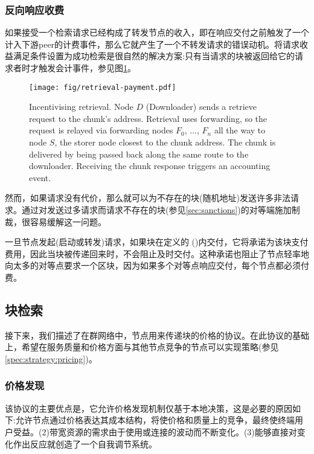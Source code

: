 \subsubsection{反向响应收费}

如果接受一个检索请求已经构成了转发节点的收入，即在响应交付之前触发了一个计入下游peer的计费事件，那么它就产生了一个不转发请求的错误动机。将请求收益满足条件设置为成功检索是很自然的解决方案:只有当请求的块被返回给它的请求者时才触发会计事件，参见图\ref{fig:retrieval-payment}。


\begin{figure}[htbp]
   \centering
   \texttt{[image: fig/retrieval-payment.pdf]}
   \caption[Incentivising retrieval \statusgreen]{Incentivising retrieval. Node $D$ (Downloader) sends a retrieve request to the chunk's address. Retrieval uses forwarding, so the request is relayed via forwarding nodes $F_0$, ..., $F_n$ all the way to node $S$, the storer node closest to the chunk address. The chunk is delivered by being passed back along the same route to the downloader. Receiving the chunk response triggers an accounting event.}
   \label{fig:retrieval-payment}
\end{figure}

然而，如果请求没有代价，那么就可以为不存在的块(随机地址)发送许多非法请求。通过对发送过多请求而请求不存在的块(参见\ref{sec:sanctions})的对等端施加制裁，很容易缓解这一问题。

一旦节点发起(启动或转发)请求，如果块在定义的 ()内交付，它将承诺为该块支付费用，因此当块被传递回来时，不会阻止及时交付。这种承诺也阻止了节点轻率地向太多的对等点要求一个区块，因为如果多个对等点响应交付，每个节点都必须付费。


\subsection{块检索}\label{sec:pricing}

\green{}

接下来，我们描述了在群网络中，节点用来传递块的价格的协议。在此协议的基础上，希望在服务质量和价格方面与其他节点竞争的节点可以实现策略(参见\ref{spec:strategy:pricing})。 

\subsubsection{价格发现}\label{sec:retrieval-price-discovery}

该协议的主要优点是，它允许价格发现机制仅基于本地决策，这是必要的原因如下:允许节点通过价格表达其成本结构，将使价格和质量上的竞争，最终使终端用户受益。(2)带宽资源的需求由于使用或连接的波动而不断变化。(3)能够直接对变化作出反应就创造了一个自我调节系统。 

